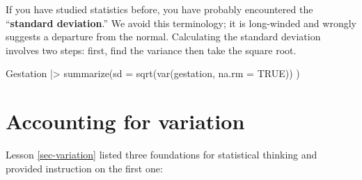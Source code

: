 \documentclass[
  letterpaper,
  DIV=11,
  numbers=noendperiod,
  oneside]{scrartcl}
\newenvironment{Shaded}{\begin{snugshade}}{\end{snugshade}}
\newcommand{\AttributeTok}[1]{\textcolor[rgb]{0.40,0.45,0.13}{#1}}
\newcommand{\ConstantTok}[1]{\textcolor[rgb]{0.56,0.35,0.01}{#1}}
\newcommand{\FunctionTok}[1]{\textcolor[rgb]{0.28,0.35,0.67}{#1}}
\newcommand{\NormalTok}[1]{\textcolor[rgb]{0.00,0.23,0.31}{#1}}
\newcommand{\SpecialCharTok}[1]{\textcolor[rgb]{0.37,0.37,0.37}{#1}}
\begin{document}
\begin{tcolorbox}[enhanced jigsaw, colbacktitle=quarto-callout-note-color!10!white, opacityback=0, breakable, opacitybacktitle=0.6, colback=white, coltitle=black, arc=.35mm, title=\textcolor{quarto-callout-note-color}{\faInfo}\hspace{0.5em}{From variance to ``standard deviation''}, left=2mm, colframe=quarto-callout-note-color-frame, rightrule=.15mm, bottomrule=.15mm, leftrule=.75mm, bottomtitle=1mm, toptitle=1mm, titlerule=0mm, toprule=.15mm]

If you have studied statistics before, you have probably encountered the
``\textbf{standard deviation}.'' We avoid this terminology; it is
long-winded and wrongly suggests a departure from the normal.
Calculating the standard deviation involves two steps: first, find the
variance then take the square root.

\begin{Shaded}
\begin{Highlighting}[]
\NormalTok{Gestation }\SpecialCharTok{|\textgreater{}}
  \FunctionTok{summarize}\NormalTok{(}\AttributeTok{sd =} \FunctionTok{sqrt}\NormalTok{(}\FunctionTok{var}\NormalTok{(gestation, }\AttributeTok{na.rm =} \ConstantTok{TRUE}\NormalTok{)) )}
\end{Highlighting}
\end{Shaded}

\end{tcolorbox}

\newpage

\section{Accounting for variation}\label{sec-accounting-for-variation}

Lesson \ref{sec-variation} listed three foundations for statistical
thinking and provided instruction on the first one:
\end{document}

